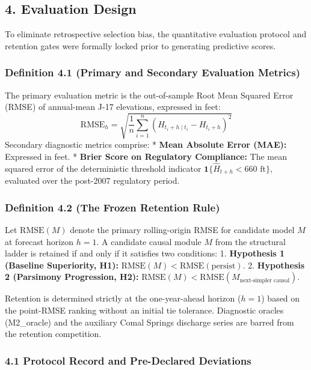 \documentclass[11pt]{article}
\begin{document}
\subsection{4. Evaluation Design}\label{evaluation-design}

To eliminate retrospective selection bias, the quantitative evaluation
protocol and retention gates were formally locked prior to generating
predictive scores.

\subsubsection{Definition 4.1 (Primary and Secondary Evaluation
Metrics)}\label{definition-4.1-primary-and-secondary-evaluation-metrics}

The primary evaluation metric is the out-of-sample Root Mean Squared
Error (RMSE) of annual-mean J-17 elevations, expressed in feet:
\[\mathrm{RMSE}_h = \sqrt{\frac{1}{n} \sum_{i=1}^n \left( \hat{H}_{t_i+h \mid t_i} - H_{t_i+h} \right)^2}\]
Secondary diagnostic metrics comprise: * \textbf{Mean Absolute Error
(MAE):} Expressed in feet. * \textbf{Brier Score on Regulatory
Compliance:} The mean squared error of the deterministic threshold
indicator \(\mathbf{1}\{\hat{H}_{t+h} < 660\text{ ft}\}\), evaluated
over the post-2007 regulatory period.

\subsubsection{Definition 4.2 (The Frozen Retention
Rule)}\label{definition-4.2-the-frozen-retention-rule}

Let \(\mathrm{RMSE}(M)\) denote the primary rolling-origin RMSE for
candidate model \(M\) at forecast horizon \(h=1\). A candidate causal
module \(M\) from the structural ladder is retained if and only if it
satisfies two conditions: 1. \textbf{Hypothesis 1 (Baseline Superiority,
H1):} \(\mathrm{RMSE}(M) < \mathrm{RMSE}(\text{persist})\). 2.
\textbf{Hypothesis 2 (Parsimony Progression, H2):}
\(\mathrm{RMSE}(M) < \mathrm{RMSE}(M_{\text{next-simpler causal}})\).

Retention is determined strictly at the one-year-ahead horizon (\(h=1\))
based on the point-RMSE ranking without an initial tie tolerance.
Diagnostic oracles (M2\_oracle) and the auxiliary Comal Springs
discharge series are barred from the retention competition.

\subsubsection{4.1 Protocol Record and Pre-Declared
Deviations}\label{protocol-record-and-pre-declared-deviations}
\end{document}
